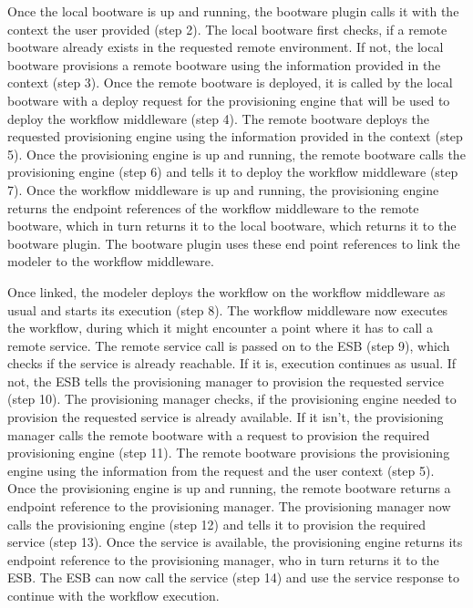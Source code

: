 Once the local bootware is up and running, the bootware plugin calls it with the context the user provided (step 2).
The local bootware first checks, if a remote bootware already exists in the requested remote environment.
If not, the local bootware provisions a remote bootware using the information provided in the context (step 3).
Once the remote bootware is deployed, it is called by the local bootware with a deploy request for the provisioning engine that will be used to deploy the workflow middleware (step 4).
The remote bootware deploys the requested provisioning engine using the information provided in the context (step 5).
Once the provisioning engine is up and running, the remote bootware calls the provisioning engine (step 6) and tells it to deploy the workflow middleware (step 7).
Once the workflow middleware is up and running, the provisioning engine returns the endpoint references of the workflow middleware to the remote bootware, which in turn returns it to the local bootware, which returns it to the bootware plugin.
The bootware plugin uses these end point references to link the modeler to the workflow middleware.

Once linked, the modeler deploys the workflow on the workflow middleware as usual and starts its execution (step 8).
The workflow middleware now executes the workflow, during which it might encounter a point where it has to call a remote service.
The remote service call is passed on to the ESB (step 9), which checks if the service is already reachable.
If it is, execution continues as usual.
If not, the ESB tells the provisioning manager to provision the requested service (step 10).
The provisioning manager checks, if the provisioning engine needed to provision the requested service is already available.
If it isn't, the provisioning manager calls the remote bootware with a request to provision the required provisioning engine (step 11).
The remote bootware provisions the provisioning engine using the information from the request and the user context (step 5).
Once the provisioning engine is up and running, the remote bootware returns a endpoint reference to the provisioning manager.
The provisioning manager now calls the provisioning engine (step 12) and tells it to provision the required service (step 13).
Once the service is available, the provisioning engine returns its endpoint reference to the provisioning manager, who in turn returns it to the ESB.
The ESB can now call the service (step 14) and use the service response to continue with the workflow execution.

